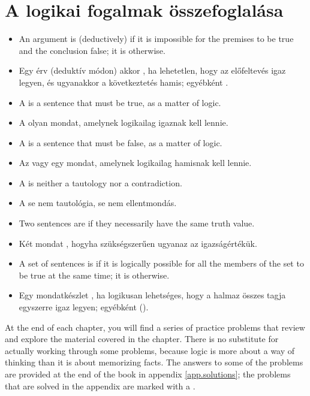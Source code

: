 \section*{A logikai fogalmak összefoglalása}
\begin{itemize}
\item An argument is (deductively)  if it is impossible for the premises to be true and the conclusion false; it is  otherwise.
\item Egy érv (deduktív módon) akkor , ha lehetetlen, hogy az előfeltevés igaz legyen, és ugyanakkor a következtetés hamis; egyébként . 
\item A  is a sentence that must be true, as a matter of logic.
\item A  olyan mondat, amelynek logikailag igaznak kell lennie.
\item A  is a sentence that must be false, as a matter of logic.
\item Az  vagy  egy mondat, amelynek logikailag  hamisnak kell lennie. 
\item A  is neither a tautology nor a contradiction.
\item A  se nem tautológia, se nem ellentmondás.
\item Two sentences are  if they necessarily have the same truth value.
\item Két mondat , hogyha szükségszerűen ugyanaz az igazságértékük. 
\item A set of sentences is  if it is logically possible for all the members of the set to be true at the same time; it is  otherwise.
\item Egy mondatkészlet , ha logikusan lehetséges, hogy a halmaz összes tagja egyszerre igaz legyen; egyébként  ().
\end{itemize}




\practiceproblems
At the end of each chapter, you will find a series of practice problems that review and explore the material covered in the chapter. There is no substitute for actually working through some problems, because logic is more about a way of thinking than it is about memorizing facts. The answers to some of the problems are provided at the end of the book in appendix \ref{app.solutions}; the problems that are solved in the appendix are marked with a \solutions.

